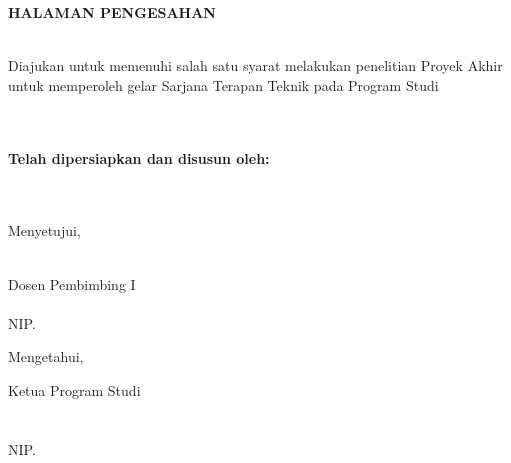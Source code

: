 \newpage
\begin{center}
    \begin{doublespace}
        \textbf{\large \MakeUppercase{HALAMAN PENGESAHAN}} \\ [0.5cm]
        \textbf{\normalsize \MakeUppercase{{\tipe} \\ {\judul}}}
    \end{doublespace}
\end{center}

\begin{center}
    Diajukan untuk memenuhi salah satu syarat melakukan penelitian Proyek Akhir untuk memperoleh gelar Sarjana Terapan Teknik pada Program Studi \\ {\prodi} {\departemen} \\ {\fakultas} {\universitas} \\[1cm]
\end{center}

\begin{center}
    \textbf{Telah dipersiapkan dan disusun oleh:} \\ [0.5cm]
    \textbf{\MakeUppercase{\underline{\penulisPertama}}} \\
    \textbf{\MakeUppercase{{\nimPertama}}} \\[1cm]
\end{center}

\begin{center}
    Menyetujui, \\[1cm]
\end{center}

\begin{center}
    \hfill\\[0.25cm]
    Dosen Pembimbing I \\[2cm]
    \underline{\dosenPembimbingI}\\
    NIP. {\nipDosenPembimbingI}
\end{center}

\begin{center}
    Mengetahui, \\[1cm]
\end{center}

\begin{center}
    Ketua Program Studi \\ {\prodi} \\[2cm]
    \underline{\ketuaProgramStudi}\\
    NIP. {\nipKetuaProgramStudi} \\[3cm]
\end{center}

